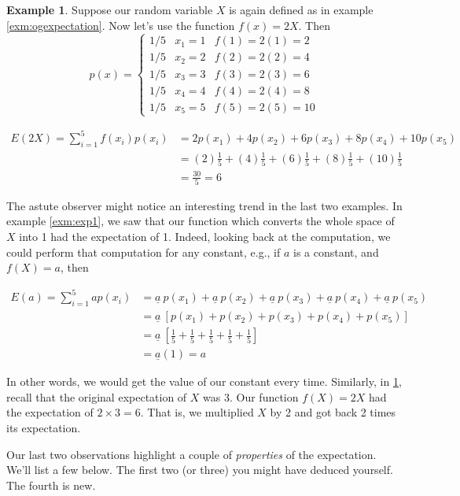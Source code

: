 \documentclass[
]{book}
\theoremstyle{definition}
\theoremstyle{definition}
\newtheorem{example}{Example}[chapter]
\theoremstyle{definition}
\theoremstyle{definition}
\theoremstyle{remark}
\begin{document}
\begin{example}
\protect\hypertarget{exm:exp2}{}\label{exm:exp2}Suppose our random variable \(X\) is again defined as in example \ref{exm:ogexpectation}. Now let's use the function \(f(x)= 2X\). Then
\[
p(x) = 
\begin{cases}
1/5 & x_1 = 1 & f(1) = 2(1) = 2 \\
1/5 & x_2 = 2 & f(2) = 2(2) = 4 \\
1/5 & x_3 = 3 & f(3) = 2(3) = 6 \\
1/5 & x_4 = 4 & f(4) = 2(4) = 8 \\
1/5 & x_5 = 5 & f(5) = 2(5) = 10 
\end{cases}
\]

\begin{align}
E(2X) = \sum_{i=1}^{5} f(x_i)p(x_i) &= 2p(x_1)+4p(x_2)+6p(x_3)+8p(x_4)+10p(x_5) \\
&= (2)\frac{1}{5} + (4)\frac{1}{5} + (6)\frac{1}{5} + (8)\frac{1}{5} + (10)\frac{1}{5} \\
&= \frac{30}{5} = 6
\end{align}

\end{example}

The astute observer might notice an interesting trend in the last two examples. In example \ref{exm:exp1}, we saw that our function which converts the whole space of \(X\) into 1 had the expectation of 1. Indeed, looking back at the computation, we could perform that computation for any constant, e.g., if \(a\) is a constant, and \(f(X) = a\), then

\begin{align}
E(a) = \sum_{i=1}^{5} ap(x_i) &= \underline{a}\:p(x_1)+\underline{a}\:p(x_2)+\underline{a}\:p(x_3)+\underline{a}\:p(x_4)+\underline{a}\:p(x_5) \\
&= \underline{a}\:[p(x_1) + p(x_2) + p(x_3) + p(x_4) + p(x_5)] \\
&= \underline{a}\:[\frac{1}{5} + \frac{1}{5} + \frac{1}{5} + \frac{1}{5} + \frac{1}{5}] \\
&= \underline{a}(1) = a
\end{align}

In other words, we would get the value of our constant every time. Similarly, in \ref{exm:exp2}, recall that the original expectation of \(X\) was 3. Our function \(f(X) = 2X\) had the expectation of \(2\times3 = 6\). That is, we multiplied \(X\) by 2 and got back 2 times its expectation.

Our last two observations highlight a couple of \emph{properties} of the expectation. We'll list a few below. The first two (or three) you might have deduced yourself. The fourth is new.
\end{document}
